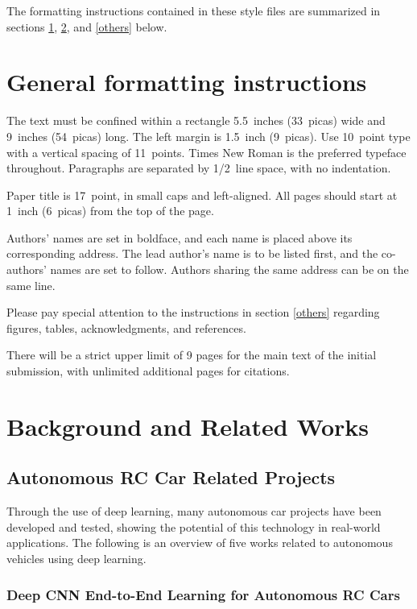 \documentclass{article} %
\begin{document}
The formatting instructions contained in these style files are summarized in
sections \ref{gen_inst}, \ref{headings}, and \ref{others} below.

\section{General formatting instructions}
\label{gen_inst}

The text must be confined within a rectangle 5.5~inches (33~picas) wide and
9~inches (54~picas) long. The left margin is 1.5~inch (9~picas).
Use 10~point type with a vertical spacing of 11~points. Times New Roman is the
preferred typeface throughout. Paragraphs are separated by 1/2~line space,
with no indentation.

Paper title is 17~point, in small caps and left-aligned.
All pages should start at 1~inch (6~picas) from the top of the page.

Authors' names are
set in boldface, and each name is placed above its corresponding
address. The lead author's name is to be listed first, and
the co-authors' names are set to follow. Authors sharing the
same address can be on the same line.

Please pay special attention to the instructions in section \ref{others}
regarding figures, tables, acknowledgments, and references.


There will be a strict upper limit of 9 pages for the main text of the initial submission, with unlimited additional pages for citations. 

\section{Background and Related Works}
\label{headings}

\subsection{Autonomous RC Car Related Projects}

Through the use of deep learning, many autonomous car projects have been developed and tested, showing the potential of this technology in real-world applications. 
The following is an overview of five works related to autonomous vehicles using deep learning.  


\subsubsection{Deep CNN End-to-End Learning for Autonomous RC Cars}
\end{document}
